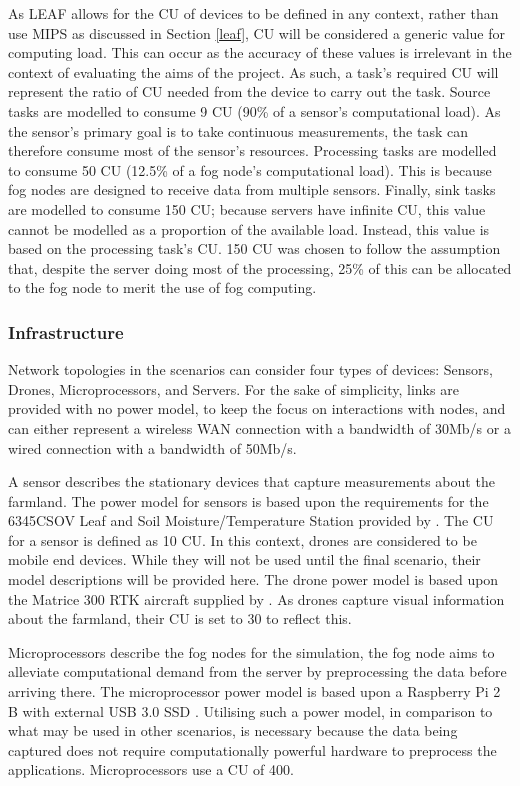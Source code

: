 \documentclass{l4proj}
\begin{document}
As LEAF allows for the CU of devices to be defined in any context, rather than use MIPS as discussed in Section \ref{leaf}, CU will be considered a generic value for computing load.
This can occur as the accuracy of these values is irrelevant in the context of evaluating the aims of the project.
As such, a task's required CU will represent the ratio of CU needed from the device to carry out the task.
Source tasks are modelled to consume 9 CU (90\% of a sensor's computational load). As the sensor's primary goal is to take continuous measurements, the task can therefore consume most of the sensor's resources.
Processing tasks are modelled to consume 50 CU (12.5\% of a fog node's computational load). This is because fog nodes are designed to receive data from multiple sensors.
Finally, sink tasks are modelled to consume 150 CU; because servers have infinite CU, this value cannot be modelled as a proportion of the available load.
Instead, this value is based on the processing task's CU. 150 CU was chosen to follow the assumption that, despite the server doing most of the processing, 25\% of this can be allocated to the fog node to merit the use of fog computing.

\subsubsection{Infrastructure}
Network topologies in the scenarios can consider four types of devices: Sensors, Drones, Microprocessors, and Servers.
For the sake of simplicity, links are provided with no power model, to keep the focus on interactions with nodes, and can either represent a wireless WAN connection with a bandwidth of 30Mb/s or a wired connection with a bandwidth of 50Mb/s.

A sensor describes the stationary devices that capture measurements about the farmland.
The power model for sensors is based upon the requirements for the 6345CSOV Leaf and Soil Moisture/Temperature Station provided by \cite{prodataWeatherSystems}.
The CU for a sensor is defined as 10 CU.
In this context, drones are considered to be mobile end devices. While they will not be used until the final scenario, their model descriptions will be provided here.
The drone power model is based upon the Matrice 300 RTK aircraft supplied by \cite{drone_spec}.
As drones capture visual information about the farmland, their CU is set to 30 to reflect this.

Microprocessors describe the fog nodes for the simulation, the fog node aims to alleviate computational demand from the server by preprocessing the data before arriving there.
The microprocessor power model is based upon a Raspberry Pi 2 B with external USB 3.0 SSD \citep{pidramble}.
Utilising such a power model, in comparison to what may be used in other scenarios, is necessary because the data being captured does not require computationally powerful hardware to preprocess the applications.
Microprocessors use a CU of 400.
\end{document}
